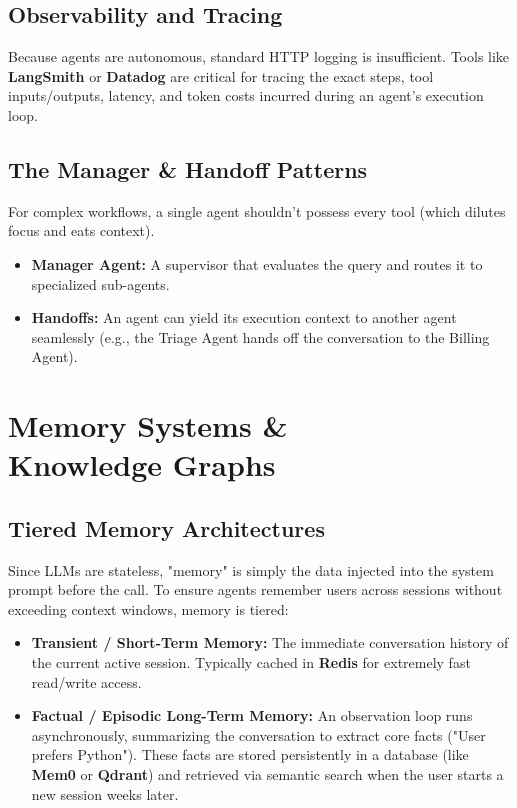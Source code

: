 \documentclass[12pt,a4paper,oneside]{book}
\begin{document}
\section{Observability and Tracing}
Because agents are autonomous, standard HTTP logging is insufficient. Tools like \textbf{LangSmith} or \textbf{Datadog} are critical for tracing the exact steps, tool inputs/outputs, latency, and token costs incurred during an agent's execution loop.

\section{The Manager \& Handoff Patterns}
For complex workflows, a single agent shouldn't possess every tool (which dilutes focus and eats context). 
\begin{itemize}
    \item \textbf{Manager Agent:} A supervisor that evaluates the query and routes it to specialized sub-agents.
    \item \textbf{Handoffs:} An agent can yield its execution context to another agent seamlessly (e.g., the Triage Agent hands off the conversation to the Billing Agent).
\end{itemize}

\chapter[Memory Systems \& Knowledge Graphs]{Memory Systems \&\\Knowledge Graphs}

\section{Tiered Memory Architectures}
Since LLMs are stateless, "memory" is simply the data injected into the system prompt before the call. To ensure agents remember users across sessions without exceeding context windows, memory is tiered:
\begin{itemize}
    \item \textbf{Transient / Short-Term Memory:} The immediate conversation history of the current active session. Typically cached in \textbf{Redis} for extremely fast read/write access.
    \item \textbf{Factual / Episodic Long-Term Memory:} An observation loop runs asynchronously, summarizing the conversation to extract core facts ("User prefers Python"). These facts are stored persistently in a database (like \textbf{Mem0} or \textbf{Qdrant}) and retrieved via semantic search when the user starts a new session weeks later.
\end{itemize}
\end{document}
